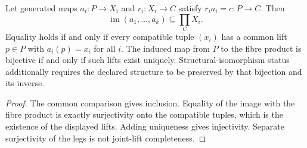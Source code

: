 \documentclass[12pt,a4paper]{article}
\begin{document}
\begin{lemma}
\label{p2a:lem:repair-joint-lift-completeness}
Let generated maps $a_i:P\to X_i$ and $r_i:X_i\to C$ satisfy
$r_i a_i=c:P\to C$. Then
\[
 \operatorname{im}(a_1,\ldots,a_k)\subseteq\prod_C X_i.
\]
Equality holds if and only if every compatible tuple $(x_i)$ has a common
lift $p\in P$ with $a_i(p)=x_i$ for all $i$. The induced map from $P$ to the
fibre product is bijective if and only if such lifts exist uniquely.
Structural-isomorphism status additionally requires the declared structure
to be preserved by that bijection and its inverse.
\end{lemma}
\begin{proof}
The common comparison gives inclusion. Equality of the image with the
fibre product is exactly surjectivity onto the compatible tuples, which is
the existence of the displayed lifts. Adding uniqueness gives injectivity.
Separate surjectivity of the legs is not joint-lift completeness.
\end{proof}
\end{document}
